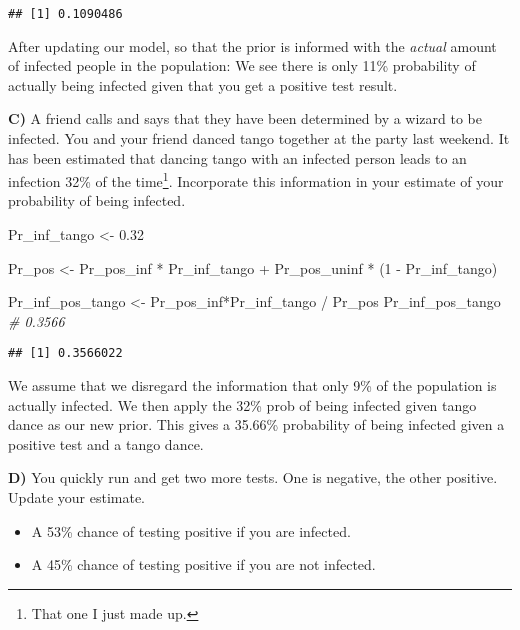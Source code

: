 \documentclass[
]{article}
\newenvironment{Shaded}{\begin{snugshade}}{\end{snugshade}}
\newcommand{\CommentTok}[1]{\textcolor[rgb]{0.56,0.35,0.01}{\textit{#1}}}
\newcommand{\DecValTok}[1]{\textcolor[rgb]{0.00,0.00,0.81}{#1}}
\newcommand{\FloatTok}[1]{\textcolor[rgb]{0.00,0.00,0.81}{#1}}
\newcommand{\NormalTok}[1]{#1}
\newcommand{\OtherTok}[1]{\textcolor[rgb]{0.56,0.35,0.01}{#1}}
\newcommand{\SpecialCharTok}[1]{\textcolor[rgb]{0.00,0.00,0.00}{#1}}
\providecommand{\tightlist}{%
  \setlength{\itemsep}{0pt}\setlength{\parskip}{0pt}}
\begin{document}
\begin{verbatim}
## [1] 0.1090486
\end{verbatim}

After updating our model, so that the prior is informed with the
\emph{actual} amount of infected people in the population: We see there
is only 11\% probability of actually being infected given that you get a
positive test result.

\textbf{C)} A friend calls and says that they have been determined by a
wizard to be infected. You and your friend danced tango together at the
party last weekend. It has been estimated that dancing tango with an
infected person leads to an infection 32\% of the time\footnote{That one
  I just made up.}. Incorporate this information in your estimate of
your probability of being infected.

\begin{Shaded}
\begin{Highlighting}[]
\NormalTok{Pr\_inf\_tango }\OtherTok{\textless{}{-}} \FloatTok{0.32}

\NormalTok{Pr\_pos }\OtherTok{\textless{}{-}}\NormalTok{ Pr\_pos\_inf }\SpecialCharTok{*}\NormalTok{ Pr\_inf\_tango }\SpecialCharTok{+}\NormalTok{ Pr\_pos\_uninf }\SpecialCharTok{*}\NormalTok{ (}\DecValTok{1} \SpecialCharTok{{-}}\NormalTok{ Pr\_inf\_tango)}

\NormalTok{Pr\_inf\_pos\_tango }\OtherTok{\textless{}{-}}\NormalTok{ Pr\_pos\_inf}\SpecialCharTok{*}\NormalTok{Pr\_inf\_tango }\SpecialCharTok{/}\NormalTok{ Pr\_pos}
\NormalTok{Pr\_inf\_pos\_tango }\CommentTok{\# 0.3566}
\end{Highlighting}
\end{Shaded}

\begin{verbatim}
## [1] 0.3566022
\end{verbatim}

We assume that we disregard the information that only 9\% of the
population is actually infected. We then apply the 32\% prob of being
infected given tango dance as our new prior. This gives a 35.66\%
probability of being infected given a positive test and a tango dance.

\textbf{D)} You quickly run and get two more tests. One is negative, the
other positive. Update your estimate.

\begin{itemize}
\tightlist
\item
  A 53\% chance of testing positive if you are infected.
\item
  A 45\% chance of testing positive if you are not infected.
\end{itemize}
\end{document}
